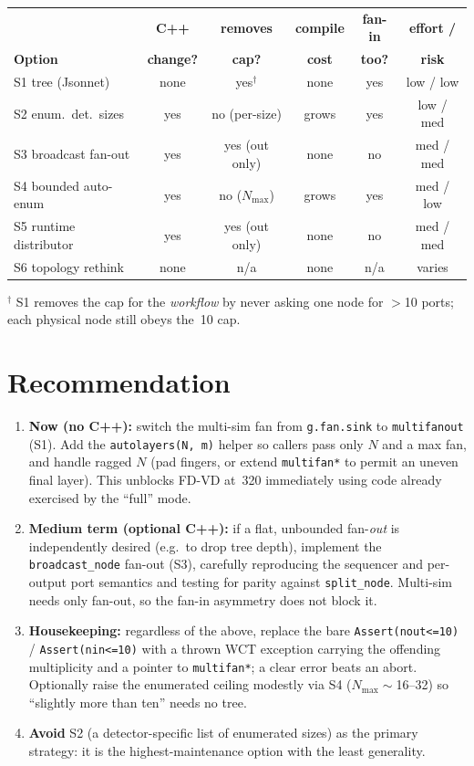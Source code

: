 \documentclass[11pt]{article}
\newcommand{\code}[1]{\texttt{#1}}
\begin{document}
\begin{center}
\renewcommand{\arraystretch}{1.25}
\begin{tabular}{|l|c|c|c|c|c|}
\hline
 & \textbf{C++} & \textbf{removes} & \textbf{compile} & \textbf{fan-in} &
   \textbf{effort /} \\
\textbf{Option} & \textbf{change?} & \textbf{cap?} & \textbf{cost} &
   \textbf{too?} & \textbf{risk} \\
\hline
S1 tree (Jsonnet)      & none & yes$^\dagger$ & none & yes & low / low \\
S2 enum.\ det.\ sizes  & yes  & no (per-size) & grows & yes & low / med \\
S3 broadcast fan-out   & yes  & yes (out only)& none  & no  & med / med \\
S4 bounded auto-enum   & yes  & no ($N_{\max}$)& grows & yes & med / low \\
S5 runtime distributor & yes  & yes (out only)& none  & no  & med / med \\
S6 topology rethink    & none & n/a           & none  & n/a & varies \\
\hline
\end{tabular}
\end{center}
\noindent
{\footnotesize $^\dagger$ S1 removes the cap for the \emph{workflow} by never
asking one node for $>$10 ports; each physical node still obeys the~10 cap.}

\section{Recommendation}

\begin{enumerate}
\item \textbf{Now (no C++):} switch the multi-sim fan from \code{g.fan.sink} to
  \code{multifanout} (S1).  Add the \code{autolayers(N, m)} helper so callers
  pass only $N$ and a max fan, and handle ragged $N$ (pad fingers, or extend
  \code{multifan*} to permit an uneven final layer).  This unblocks FD-VD at~320
  immediately using code already exercised by the ``full'' mode.
\item \textbf{Medium term (optional C++):} if a flat, unbounded fan-\emph{out} is
  independently desired (e.g.\ to drop tree depth), implement the
  \code{broadcast\_node} fan-out (S3), carefully reproducing the sequencer and
  per-output port semantics and testing for parity against \code{split\_node}.
  Multi-sim needs only fan-out, so the fan-in asymmetry does not block it.
\item \textbf{Housekeeping:} regardless of the above, replace the bare
  \code{Assert(nout<=10)} / \code{Assert(nin<=10)} with a thrown WCT exception
  carrying the offending multiplicity and a pointer to \code{multifan*}; a clear
  error beats an abort.  Optionally raise the enumerated ceiling modestly via S4
  ($N_{\max}\sim$16--32) so ``slightly more than ten'' needs no tree.
\item \textbf{Avoid} S2 (a detector-specific list of enumerated sizes) as the
  primary strategy: it is the highest-maintenance option with the least
  generality.
\end{enumerate}
\end{document}
